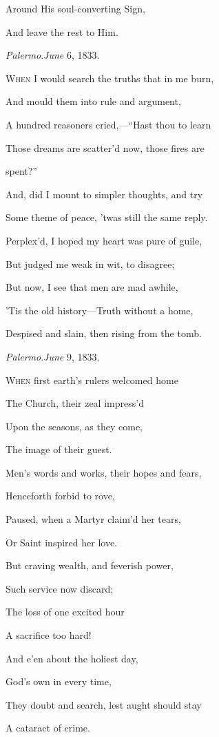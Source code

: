 Around His soul-converting Sign,

And leave the rest to Him.

\emph{Palermo}.\emph{June} 6, 1833.


W\textsc{hen} I would search the truths that in me burn,

And mould them into rule and argument,

A hundred reasoners cried,—``Hast thou to learn

Those dreams are scatter'd now, those fires are

spent?''

And, did I mount to simpler thoughts, and try

Some theme of peace, 'twas still the same reply.

Perplex'd, I hoped my heart was pure of guile,

But judged me weak in wit, to disagree;

But now, I see that men are mad awhile,

'Tis the old history—Truth without a home,

Despised and slain, then rising from the tomb.

\emph{Palermo}.\emph{June} 9, 1833.


W\textsc{hen} first earth's rulers welcomed home

The Church, their zeal impress'd

Upon the seasons, as they come,

The image of their guest.

Men's words and works, their hopes and fears,

Henceforth forbid to rove,

Paused, when a Martyr claim'd her tears,

Or Saint inspired her love.

But craving wealth, and feverish power,

Such service now discard;

The loss of one excited hour

A sacrifice too hard!

And e'en about the holiest day,

God's own in every time,

They doubt and search, lest aught should stay

A cataract of crime. 

